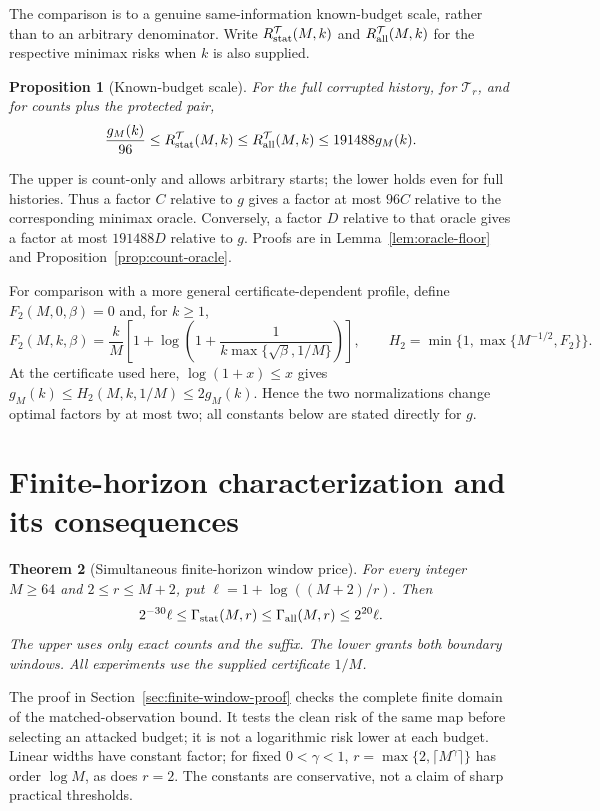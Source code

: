 \documentclass[11pt,letterpaper]{article}
\newcommand{\cT}{\mathcal T}
\newtheorem{theorem}{Theorem}[section]
\newtheorem{proposition}[theorem]{Proposition}
\theoremstyle{definition}
\theoremstyle{remark}
\numberwithin{equation}{section}
\begin{document}
The comparison is to a genuine same-information known-budget scale, rather than to an arbitrary denominator. Write $R^{\cT}_{\rm stat}(M,k)$ and $R^{\cT}_{\rm all}(M,k)$ for the respective minimax risks when $k$ is also supplied.
\begin{proposition}[Known-budget scale]\label{prop:oracle}
For the full corrupted history, for $\cT_r$, and for counts plus the protected pair,
\begin{equation}\label{eq:oracle}
 \frac{g_M(k)}{96}\le R^{\cT}_{\rm stat}(M,k)
 \le R^{\cT}_{\rm all}(M,k)\le191488g_M(k).
\end{equation}
\end{proposition}
The upper is count-only and allows arbitrary starts; the lower holds even for full histories. Thus a factor $C$ relative to $g$ gives a factor at most $96C$ relative to the corresponding minimax oracle. Conversely, a factor $D$ relative to that oracle gives a factor at most $191488D$ relative to $g$. Proofs are in Lemma~\ref{lem:oracle-floor} and Proposition~\ref{prop:count-oracle}.

For comparison with a more general certificate-dependent profile, define $F_2(M,0,\beta)=0$ and, for $k\ge1$,
\[
 F_2(M,k,\beta)=\frac{k}{M}\left[1+\log\left(1+
 \frac1{k\max\{\sqrt\beta,1/M\}}\right)\right],\qquad
 H_2=\min\{1,\max\{M^{-1/2},F_2\}\}.
\]
At the certificate used here, $\log(1+x)\le x$ gives $g_M(k)\le H_2(M,k,1/M)\le2g_M(k)$. Hence the two normalizations change optimal factors by at most two; all constants below are stated directly for $g$.

\section{Finite-horizon characterization and its consequences}\label{sec:results}
\begin{theorem}[Simultaneous finite-horizon window price]\label{thm:finite-window}
For every integer $M\ge64$ and $2\le r\le M+2$, put
$\ell=1+\log((M+2)/r)$. Then
\begin{equation}\label{eq:finite-window}
 2^{-30}\ell\le\Gamma_{\rm stat}(M,r)
 \le\Gamma_{\rm all}(M,r)\le2^{20}\ell.
\end{equation}
The upper uses only exact counts and the suffix. The lower grants both
boundary windows. All experiments use the supplied certificate $1/M$.
\end{theorem}
The proof in Section~\ref{sec:finite-window-proof} checks the complete finite
domain of the matched-observation bound. It tests the clean risk of the same
map before selecting an attacked budget; it is not a logarithmic risk lower
at each budget. Linear widths have constant factor; for fixed $0<\gamma<1$,
$r=\max\{2,\lceil M^\gamma\rceil\}$ has order $\log M$, as does $r=2$.
The constants are conservative, not a claim of sharp practical thresholds.
\end{document}
